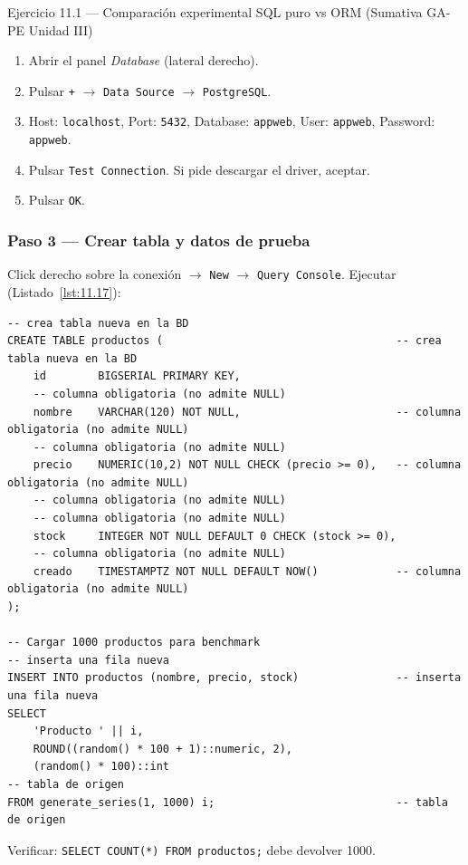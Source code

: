 \documentclass[11pt,a4paper,openany]{book}
\begin{document}
\begin{cajaejercicio}{Ejercicio 11.1 --- Comparación experimental SQL puro vs ORM (Sumativa GA-PE Unidad III)}
\begin{enumerate}
\item Abrir el panel \emph{Database} (lateral derecho).
\item Pulsar \texttt{+} $\rightarrow$ \texttt{Data Source}
$\rightarrow$ \texttt{PostgreSQL}.
\item Host: \texttt{localhost}, Port: \texttt{5432},
Database: \texttt{appweb}, User: \texttt{appweb}, Password:
\texttt{appweb}.
\item Pulsar \texttt{Test Connection}. Si pide descargar el driver,
aceptar.
\item Pulsar \texttt{OK}.
\end{enumerate}

\subsubsection*{Paso 3 --- Crear tabla y datos de prueba}

Click derecho sobre la conexión $\rightarrow$ \texttt{New}
$\rightarrow$ \texttt{Query Console}. Ejecutar (Listado~\ref{lst:11.17}):

\begin{lstlisting}[style=sql,numbers=none,caption={Ejemplo de SQL},label=lst:11.17]
-- crea tabla nueva en la BD
CREATE TABLE productos (                                    -- crea tabla nueva en la BD
    id        BIGSERIAL PRIMARY KEY,
    -- columna obligatoria (no admite NULL)
    nombre    VARCHAR(120) NOT NULL,                        -- columna obligatoria (no admite NULL)
    -- columna obligatoria (no admite NULL)
    precio    NUMERIC(10,2) NOT NULL CHECK (precio >= 0),   -- columna obligatoria (no admite NULL)
    -- columna obligatoria (no admite NULL)
    -- columna obligatoria (no admite NULL)
    stock     INTEGER NOT NULL DEFAULT 0 CHECK (stock >= 0),
    -- columna obligatoria (no admite NULL)
    creado    TIMESTAMPTZ NOT NULL DEFAULT NOW()            -- columna obligatoria (no admite NULL)
);

-- Cargar 1000 productos para benchmark
-- inserta una fila nueva
INSERT INTO productos (nombre, precio, stock)               -- inserta una fila nueva
SELECT
    'Producto ' || i,
    ROUND((random() * 100 + 1)::numeric, 2),
    (random() * 100)::int
-- tabla de origen
FROM generate_series(1, 1000) i;                            -- tabla de origen
\end{lstlisting}

Verificar: \texttt{SELECT COUNT(*) FROM productos;} debe devolver 1000.


\end{cajaejercicio}
\end{document}
